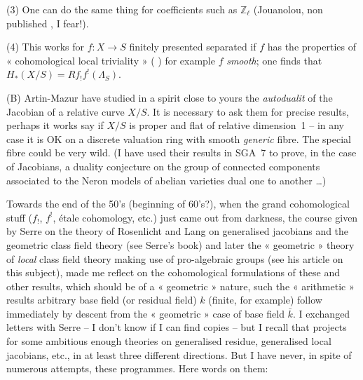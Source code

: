 \documentclass[11pt,a4paper]{article}
\begin{document}
(3) One can do the same thing for coefficients such as $\mathbb{Z}_\ell$ (Jouanolou,  non published , I fear!).

(4) This works  for $f\colon X \to S$ finitely presented separated if $f$ has the properties of « cohomological local triviality » ( ) for example $f$ \emph{smooth}; one finds that $H_*(X/S) = Rf_!f^!(\Lambda_S)$.

(B) Artin-Mazur have studied in a spirit close to yours the \emph{autodualit} of the Jacobian of a relative curve $X/S$. It is necessary to ask them for precise results, perhaps it works say if $X/S$ is proper and flat of relative dimension~1 -- in any case it is OK on a discrete valuation ring with smooth \emph{generic} fibre. The special fibre could be very wild. (I have used their results in SGA~7 to prove, in the case of Jacobians, a duality conjecture on the group of connected components associated to the Neron models of abelian varieties dual one to another …)

Towards the end  of the 50's (beginning of 60's?), when the grand cohomological stuff ($f_!$, $f^!$, étale cohomology, etc.) just came out from darkness, the course given by Serre on the theory of Rosenlicht and Lang on generalised jacobians and the geometric class field theory (see Serre's book) and later the « geometric » theory of \emph{local} class field theory making use of pro-algebraic groups (see his article on this subject), made me reflect on the cohomological formulations of these and other results, which should be of a « geometric » nature, such   the « arithmetic » results   arbitrary base field (or residual field) $k$ (finite, for example) follow immediately by descent from the « geometric » case of base field $\bar{k}$. I exchanged letters with Serre -- I don't know if I can find copies -- but I recall that   projects for some ambitious enough theories on generalised residue, generalised local jacobians, etc., in at least three different directions. But I have never, in spite of numerous attempts,   these programmes. Here   words on them:
\end{document}
